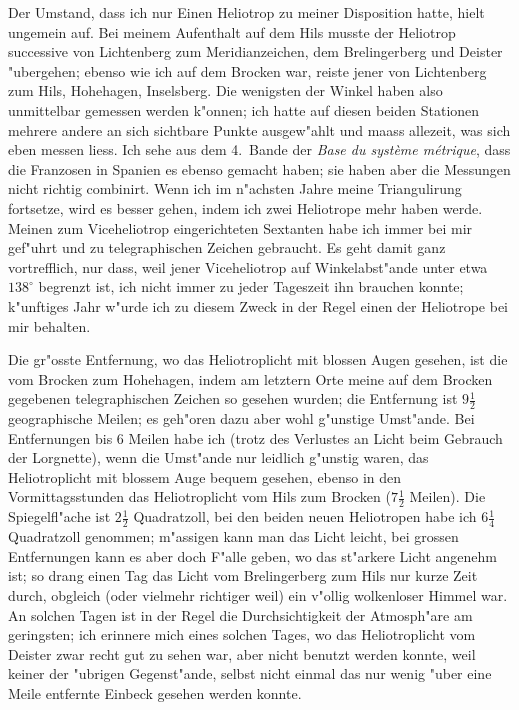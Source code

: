\documentclass[12pt,a4paper]{article}
\theoremstyle{plain}
\theoremstyle{definition}
\theoremstyle{remark}
\begin{document}
Der Umstand, dass ich nur Einen Heliotrop zu meiner Disposition hatte, hielt ungemein auf. Bei meinem Aufenthalt auf dem Hils musste der Heliotrop successive von Lichtenberg zum Meridianzeichen, dem Brelingerberg und Deister "ubergehen; ebenso wie ich auf dem Brocken war, reiste jener von Lichtenberg zum Hils, Hohehagen, Inselsberg. Die wenigsten der Winkel haben also unmittelbar gemessen werden k"onnen; ich hatte auf diesen beiden Stationen mehrere andere an sich sichtbare Punkte ausgew"ahlt und maass allezeit, was sich eben messen liess. Ich sehe aus dem 4.\ Bande der \emph{Base du syst\`eme m\'etrique}, dass die Franzosen in Spanien es ebenso gemacht haben; sie haben aber die Messungen nicht richtig combinirt. Wenn ich im n"achsten Jahre meine Triangulirung fortsetze, wird es besser gehen, indem ich zwei Heliotrope mehr haben werde. Meinen zum Viceheliotrop eingerichteten Sextanten habe ich immer bei mir gef"uhrt und zu telegraphischen Zeichen gebraucht. Es geht damit ganz vortrefflich, nur dass, weil jener Viceheliotrop auf Winkelabst"ande unter etwa $138^{\circ}$ begrenzt ist, ich nicht immer zu jeder Tageszeit ihn brauchen konnte; k"unftiges Jahr w"urde ich zu diesem Zweck in der Regel einen der Heliotrope bei mir behalten.

Die gr"osste Entfernung, wo das Heliotroplicht mit blossen Augen gesehen, ist die vom Brocken zum Hohehagen, indem am letztern Orte meine auf dem Brocken gegebenen telegraphischen Zeichen so gesehen wurden; die Entfernung ist $9\frac{1}{2}$ geographische Meilen; es geh"oren dazu aber wohl g"unstige Umst"ande. Bei Entfernungen bis 6 Meilen habe ich (trotz des Verlustes an Licht beim Gebrauch der Lorgnette), wenn die Umst"ande nur leidlich g"unstig waren, das Heliotroplicht mit blossem Auge bequem gesehen, ebenso in den Vormittagsstunden das Heliotroplicht vom Hils zum Brocken ($7\frac{1}{2}$ Meilen). Die Spiegelfl"ache ist $2\frac{1}{2}$ Quadratzoll, bei den beiden neuen Heliotropen habe ich $6\frac{1}{4}$ Quadratzoll genommen; m"assigen kann man das Licht leicht, bei grossen Entfernungen kann es aber doch F"alle geben, wo das st"arkere Licht angenehm ist; so drang einen Tag das Licht vom Brelingerberg zum Hils nur kurze Zeit durch, obgleich (oder vielmehr richtiger weil) ein v"ollig wolkenloser Himmel war. An solchen Tagen ist in der Regel die Durchsichtigkeit der Atmosph"are am geringsten; ich erinnere mich eines solchen Tages, wo das Heliotroplicht vom Deister zwar recht gut zu sehen war, aber nicht benutzt werden konnte, weil keiner der "ubrigen Gegenst"ande, selbst nicht einmal das nur wenig "uber eine Meile entfernte Einbeck gesehen werden konnte.
\end{document}
